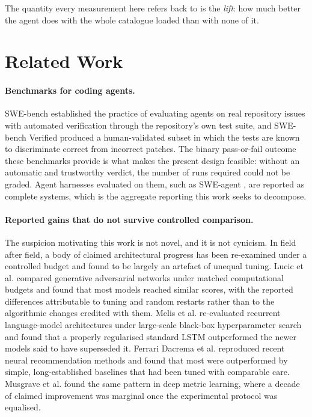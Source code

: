\documentclass[11pt]{article}
\theoremstyle{plain}
\theoremstyle{definition}
\theoremstyle{remark}
\begin{document}
The quantity every measurement here refers back to is the \emph{lift}: how much better the agent does with the whole catalogue loaded than with none of it.

\section{Related Work}

\paragraph{Benchmarks for coding agents.} SWE-bench \cite{swebench} established the practice of evaluating agents on real repository issues with automated verification through the repository's own test suite, and SWE-bench Verified \cite{verified} produced a human-validated subset in which the tests are known to discriminate correct from incorrect patches. The binary pass-or-fail outcome these benchmarks provide is what makes the present design feasible: without an automatic and trustworthy verdict, the number of runs required could not be graded. Agent harnesses evaluated on them, such as SWE-agent \cite{sweagent}, are reported as complete systems, which is the aggregate reporting this work seeks to decompose.

\paragraph{Reported gains that do not survive controlled comparison.} The suspicion motivating this work is not novel, and it is not cynicism. In field after field, a body of claimed architectural progress has been re-examined under a controlled budget and found to be largely an artefact of unequal tuning. Lucic et al. \cite{lucic} compared generative adversarial networks under matched computational budgets and found that most models reached similar scores, with the reported differences attributable to tuning and random restarts rather than to the algorithmic changes credited with them. Melis et al. \cite{melis} re-evaluated recurrent language-model architectures under large-scale black-box hyperparameter search and found that a properly regularised standard LSTM outperformed the newer models said to have superseded it. Ferrari Dacrema et al. \cite{dacrema} reproduced recent neural recommendation methods and found that most were outperformed by simple, long-established baselines that had been tuned with comparable care. Musgrave et al. \cite{musgrave} found the same pattern in deep metric learning, where a decade of claimed improvement was marginal once the experimental protocol was equalised.
\end{document}
